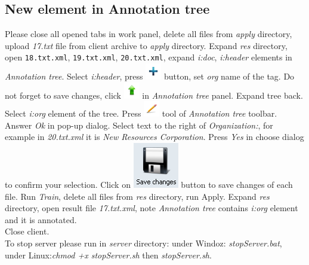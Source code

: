 \documentclass[12pt]{article}
\begin{document}
\subsection{New element in Annotation tree}
 Please close all opened tabs in work panel, delete all files from \emph{apply} directory, upload \emph{17.txt} file from client archive to \emph{apply} directory. Expand \emph{res} directory, open \texttt{18.txt.xml}, \texttt{19.txt.xml}, \texttt{20.txt.xml}, expand \emph{i:doc}, \emph{i:header} elements in \emph{Annotation tree}. Select \emph{i:header}, press \includegraphics{09AddAChildTag.png} button, set \emph{org} name of the tag. Do not forget to save changes, click \includegraphics[scale=1.0]{12UploadTreeChanges.png} in \emph{Annotation tree} panel. Expand tree back.\\

Select \emph{i:org} element of the tree. Press \includegraphics{10MarkTag.png} tool of \emph{Annotation tree} toolbar. Answer \emph{Ok} in pop-up dialog. Select text to the right of \emph{Organization:}, for example in \emph{20.txt.xml} it is \emph{New Resources Corporation}. Press \emph{Yes} in choose dialog to confirm your selection. Click on \includegraphics[scale=0.6]{11SaveChanges.png} button to save changes of each file. Run \emph{Train}, delete all files from \emph{res} directory, run Apply. Expand \emph{res} directory, open result file \emph{17.txt.xml}, note \emph{Annotation tree} contains \emph{i:org} element and it is annotated.\\
Close client.\\
To stop server please run in \emph{server} directory: under Windoz: \emph{stopServer.bat}, under Linux:\emph{chmod +x stopServer.sh} then \emph{stopServer.sh}.
\end{document}
